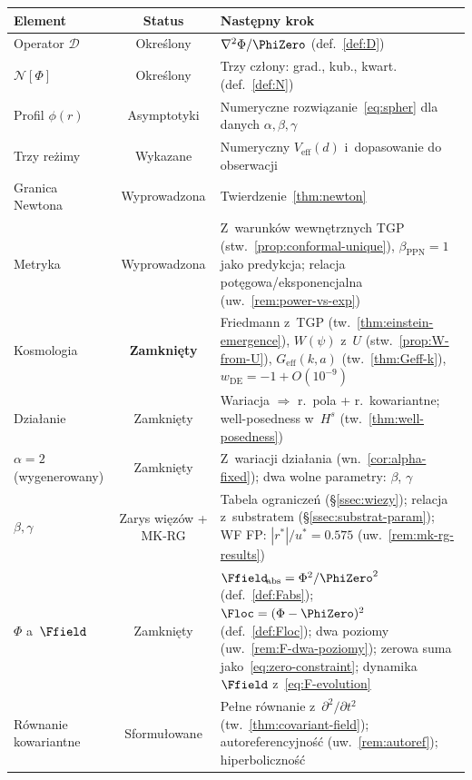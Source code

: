 \begin{center}
\small
\begin{tabular}{@{}>{\raggedright}p{3.5cm}cp{8cm}@{}}
\toprule
\textbf{Element} & \textbf{Status} & \textbf{Nast\k{e}pny krok} \\
\midrule
Operator $\mathcal{D}$ & Okre\'slony &
  $\nabla^2\Phi/\PhiZero$ (def.~\ref{def:D}) \\
$\mathcal{N}[\Phi]$ & Okre\'slony &
  Trzy cz\l{}ony: grad., kub., kwart. (def.~\ref{def:N}) \\
Profil $\phi(r)$ & Asymptotyki &
  Numeryczne rozwi\k{a}zanie~\eqref{eq:spher}
  dla danych $\alpha,\beta,\gamma$ \\
Trzy re\.zimy & Wykazane &
  Numeryczny $V_{\mathrm{eff}}(d)$ i~dopasowanie
  do obserwacji \\
Granica Newtona & Wyprowadzona &
  Twierdzenie~\ref{thm:newton} \\
Metryka & Wyprowadzona &
  Z~warunk\'ow wewn\k{e}trznych TGP
  (stw.~\ref{prop:conformal-unique}),
  $\beta_{\mathrm{PPN}} = 1$ jako predykcja;
  relacja pot\k{e}gowa/eksponencjalna
  (uw.~\ref{rem:power-vs-exp}) \\
Kosmologia & \textbf{Zamkni\k{e}ty} &
  Friedmann z~TGP (tw.~\ref{thm:einstein-emergence}),
  $W(\psi)$ z~$U$ (stw.~\ref{prop:W-from-U}),
  $G_{\mathrm{eff}}(k,a)$ (tw.~\ref{thm:Geff-k}),
  $w_{\mathrm{DE}} = -1 + O(10^{-9})$ \\
Dzia\l{}anie & Zamkni\k{e}ty &
  Wariacja $\Rightarrow$ r.\ pola + r.\ kowariantne;
  well-posedness w~$H^s$ (tw.~\ref{thm:well-posedness}) \\
$\alpha = 2$ (wygenerowany) & Zamkni\k{e}ty &
  Z~wariacji dzia\l{}ania (wn.~\ref{cor:alpha-fixed});
  dwa wolne parametry: $\beta$, $\gamma$ \\
$\beta,\gamma$ & Zarys wi\k{e}z\'ow + MK-RG &
  Tabela ogranicze\'n (\S\ref{ssec:wiezy});
  relacja z~substratem (\S\ref{ssec:substrat-param});
  WF FP: $|r^*|/u^* = 0.575$ (uw.~\ref{rem:mk-rg-results}) \\
$\Phi$ a~$\Ffield$ & Zamkni\k{e}ty &
  $\Ffield_{\!\mathrm{abs}} = \Phi^2/\PhiZero^2$ (def.~\ref{def:Fabs});
  $\Floc = (\Phi - \PhiZero)^2$ (def.~\ref{def:Floc});
  dwa poziomy (uw.~\ref{rem:F-dwa-poziomy});
  zerowa suma jako~\eqref{eq:zero-constraint};
  dynamika $\Ffield$ z~\eqref{eq:F-evolution} \\
R\'ownanie kowariantne & Sformu\l{}owane &
  Pe\l{}ne r\'ownanie z~$\partial^2/\partial t^2$
  (tw.~\ref{thm:covariant-field}); autoreferencyjno\'s\'c
  (uw.~\ref{rem:autoref}); hiperboliczno\'s\'c

\end{tabular}
\end{center}
